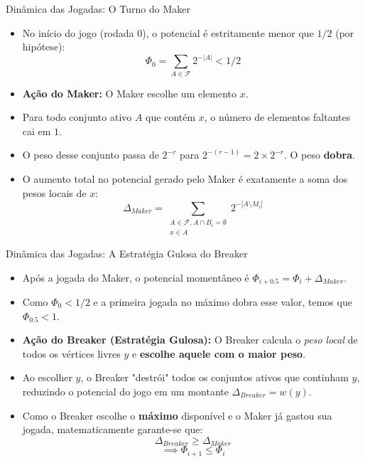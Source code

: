 \documentclass[11pt, aspectratio=169]{beamer}
\begin{document}
\begin{frame}{Dinâmica das Jogadas: O Turno do Maker}
    \begin{itemize}
        \item No início do jogo (rodada 0), o potencial é estritamente menor que $1/2$ (por hipótese): 
        $$\Phi_0 = \sum_{A \in \mathcal{F}} 2^{-|A|} < 1/2$$
        \item \textbf{Ação do Maker:} O Maker escolhe um elemento $x$.
        \item Para todo conjunto ativo $A$ que contém $x$, o número de elementos faltantes cai em $1$.
        \item O peso desse conjunto passa de $2^{-r}$ para $2^{-(r-1)} = 2 \times 2^{-r}$. O peso \textbf{dobra}.
        \item O aumento total no potencial gerado pelo Maker é exatamente a soma dos pesos locais de $x$:
        $$\Delta_{Maker} = \sum_{\substack{A \in \mathcal{F}, A \cap B_i = \emptyset \\ x \in A}} 2^{-|A \setminus M_i|}$$
    \end{itemize}
\end{frame}

\begin{frame}{Dinâmica das Jogadas: A Estratégia Gulosa do Breaker}
    \begin{itemize}
        \item Após a jogada do Maker, o potencial momentâneo é $\Phi_{i+0.5} = \Phi_i + \Delta_{Maker}$.
        \item Como $\Phi_0 < 1/2$ e a primeira jogada no máximo dobra esse valor, temos que $\Phi_{0.5} < 1$.
        \item \textbf{Ação do Breaker (Estratégia Gulosa):} O Breaker calcula o \textit{peso local} de todos os vértices livres $y$ e \textbf{escolhe aquele com o maior peso}.
        \item Ao escolher $y$, o Breaker "destrói" todos os conjuntos ativos que continham $y$, reduzindo o potencial do jogo em um montante $\Delta_{Breaker} = w(y)$.
        \item Como o Breaker escolhe o \textbf{máximo} disponível e o Maker já gastou sua jogada, matematicamente garante-se que:
        $$\Delta_{Breaker} \ge \Delta_{Maker}$$
        $$\implies \Phi_{i+1} \le \Phi_i$$
    \end{itemize}
\end{frame}
\end{document}
